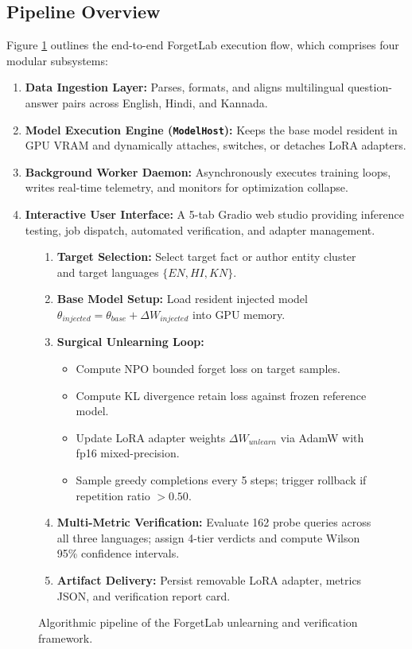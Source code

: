 \documentclass[11pt,a4paper]{article}
\begin{document}
\subsection{Pipeline Overview}
Figure \ref{fig:pipeline_flow} outlines the end-to-end ForgetLab execution flow, which comprises four modular subsystems:
\begin{enumerate}
    \item \textbf{Data Ingestion Layer:} Parses, formats, and aligns multilingual question-answer pairs across English, Hindi, and Kannada.
    \item \textbf{Model Execution Engine (\texttt{ModelHost}):} Keeps the base model resident in GPU VRAM and dynamically attaches, switches, or detaches LoRA adapters.
    \item \textbf{Background Worker Daemon:} Asynchronously executes training loops, writes real-time telemetry, and monitors for optimization collapse.
    \item \textbf{Interactive User Interface:} A 5-tab Gradio web studio providing inference testing, job dispatch, automated verification, and adapter management.
\end{enumerate}

\begin{figure}[htbp]
    \centering
    \begin{tcolorbox}[colback=white,colframe=nitkblue,title=\textbf{ForgetLab End-to-End Execution Flow},fonttitle=\bfseries]
    \footnotesize
    \begin{enumerate}
        \item \textbf{Target Selection:} Select target fact or author entity cluster and target languages $\{EN, HI, KN\}$.
        \item \textbf{Base Model Setup:} Load resident injected model $\theta_{injected} = \theta_{base} + \Delta W_{injected}$ into GPU memory.
        \item \textbf{Surgical Unlearning Loop:}
        \begin{itemize}
            \item Compute NPO bounded forget loss on target samples.
            \item Compute KL divergence retain loss against frozen reference model.
            \item Update LoRA adapter weights $\Delta W_{unlearn}$ via AdamW with fp16 mixed-precision.
            \item Sample greedy completions every 5 steps; trigger rollback if repetition ratio $> 0.50$.
        \end{itemize}
        \item \textbf{Multi-Metric Verification:} Evaluate 162 probe queries across all three languages; assign 4-tier verdicts and compute Wilson 95\% confidence intervals.
        \item \textbf{Artifact Delivery:} Persist removable LoRA adapter, metrics JSON, and verification report card.
    \end{enumerate}
    \end{tcolorbox}
    \caption{Algorithmic pipeline of the ForgetLab unlearning and verification framework.}
    \label{fig:pipeline_flow}
\end{figure}
\end{document}
